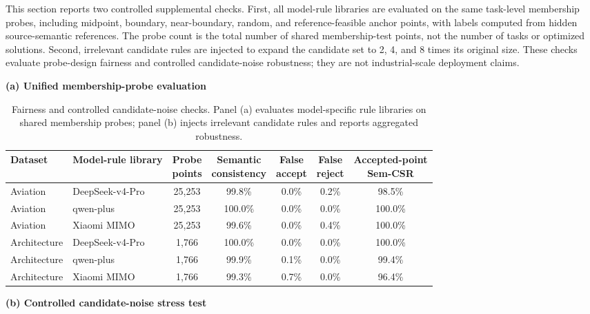 ﻿\documentclass[a4paper,fleqn]{cas-dc}
\begin{document}
This section reports two controlled supplemental checks. First, all
model-rule libraries are evaluated on the same task-level membership probes,
including midpoint, boundary, near-boundary, random, and reference-feasible
anchor points, with labels computed from hidden source-semantic references.
The probe count is the total number of shared membership-test points, not the
number of tasks or optimized solutions. Second, irrelevant candidate rules are
injected to expand the candidate set to 2, 4, and 8 times its original size.
These checks evaluate probe-design fairness and controlled candidate-noise
robustness; they are not industrial-scale deployment claims.

\begin{table}[t]
\centering
\caption{Fairness and controlled candidate-noise checks. Panel (a) evaluates model-specific rule libraries on shared membership probes; panel (b) injects irrelevant candidate rules and reports aggregated robustness.}
\label{tab:fairness_scalability}
\begingroup
\scriptsize
\setlength{\tabcolsep}{2.5pt}
\renewcommand{\arraystretch}{0.9}
\textbf{(a) Unified membership-probe evaluation}\\[-2pt]
\begin{tabular*}{\textwidth}{@{}l@{\extracolsep{\fill}}lccccc@{}}
\toprule
Dataset & Model-rule library & \shortstack{Probe\\points} &
\shortstack{Semantic\\consistency} & \shortstack{False\\accept} &
\shortstack{False\\reject} & \shortstack{Accepted-point\\Sem-CSR} \\
\midrule
Aviation & DeepSeek-v4-Pro & 25,253 & 99.8\% & 0.0\% & 0.2\% & 98.5\% \\
Aviation & qwen-plus & 25,253 & 100.0\% & 0.0\% & 0.0\% & 100.0\% \\
Aviation & Xiaomi MIMO & 25,253 & 99.6\% & 0.0\% & 0.4\% & 100.0\% \\
Architecture & DeepSeek-v4-Pro & 1,766 & 100.0\% & 0.0\% & 0.0\% & 100.0\% \\
Architecture & qwen-plus & 1,766 & 99.9\% & 0.1\% & 0.0\% & 99.4\% \\
Architecture & Xiaomi MIMO & 1,766 & 99.3\% & 0.7\% & 0.0\% & 96.4\% \\
\bottomrule
\end{tabular*}
\vspace{3pt}
\textbf{(b) Controlled candidate-noise stress test}\\[-2pt]

\end{table}
\end{document}
